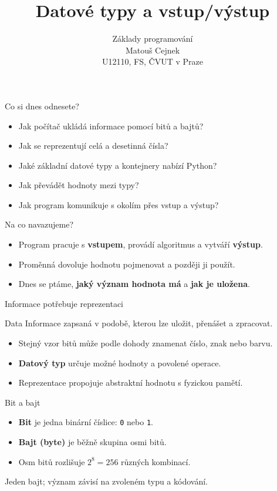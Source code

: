 \documentclass[aspectratio=169]{beamer}
\title{Datové typy a vstup/výstup}
\subtitle{Základy programování\\Matouš Cejnek\\U12110, FS, ČVUT v Praze}
\author{}
\institute{}
\date{}
\newcommand{\term}[1]{\textcolor{CodeBlue}{\textbf{#1}}}
\begin{document}
\begin{frame}
  \clearpage\thispagestyle{empty}\titlepage
\end{frame}

\begin{frame}{Co si dnes odnesete?}
  \begin{itemize}
    \item Jak počítač ukládá informace pomocí bitů a bajtů?
    \item Jak se reprezentují celá a desetinná čísla?
    \item Jaké základní datové typy a kontejnery nabízí Python?
    \item Jak převádět hodnoty mezi typy?
    \item Jak program komunikuje s okolím přes vstup a výstup?
  \end{itemize}
\end{frame}

\begin{frame}{Na co navazujeme?}
  \begin{itemize}
    \item Program pracuje s \term{vstupem}, provádí algoritmus a vytváří \term{výstup}.
    \item Proměnná dovoluje hodnotu pojmenovat a později ji použít.
    \item Dnes se ptáme, \textbf{jaký význam hodnota má} a \textbf{jak je uložena}.
  \end{itemize}
\end{frame}

\begin{frame}{Informace potřebuje reprezentaci}
  \begin{block}{Data}
    Informace zapsaná v podobě, kterou lze uložit, přenášet a zpracovat.
  \end{block}
  \begin{itemize}
    \item Stejný vzor bitů může podle dohody znamenat číslo, znak nebo barvu.
    \item \term{Datový typ} určuje možné hodnoty a povolené operace.
    \item Reprezentace propojuje abstraktní hodnotu s fyzickou pamětí.
  \end{itemize}
\end{frame}

\begin{frame}{Bit a bajt}
  \begin{itemize}
    \item \term{Bit} je jedna binární číslice: \texttt{0} nebo \texttt{1}.
    \item \term{Bajt (byte)} je běžně skupina osmi bitů.
    \item Osm bitů rozlišuje $2^8=256$ různých kombinací.
  \end{itemize}
  \vspace{5mm}
  \centering
  \Large{}
  \par\normalsize\rmfamily
  \vspace{3mm}
  Jeden bajt; význam závisí na zvoleném typu a kódování.
\end{frame}
\end{document}
